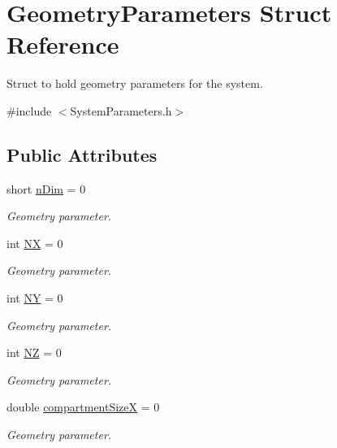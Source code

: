 \hypertarget{structGeometryParameters}{\section{Geometry\+Parameters Struct Reference}
\label{structGeometryParameters}
}


Struct to hold geometry parameters for the system.  




{\ttfamily \#include $<$System\+Parameters.\+h$>$}

\subsection*{Public Attributes}
{\bf }\par
\begin{DoxyCompactItemize}
\item 
short \hyperlink{structGeometryParameters_aa50b4a0940d8ca9da6f647a1c21d9522}{n\+Dim} = 0
\begin{DoxyCompactList}\small\item\em Geometry parameter. \end{DoxyCompactList}\item 
int \hyperlink{structGeometryParameters_a45f424cfb62b868a4becc8b0bd0d32bc}{N\+X} = 0
\begin{DoxyCompactList}\small\item\em Geometry parameter. \end{DoxyCompactList}\item 
int \hyperlink{structGeometryParameters_a5c7a33268cbfa1b236fa1bf0ef9bafc7}{N\+Y} = 0
\begin{DoxyCompactList}\small\item\em Geometry parameter. \end{DoxyCompactList}\item 
int \hyperlink{structGeometryParameters_a01890a89021cabfc92ee2b8e23faef60}{N\+Z} = 0
\begin{DoxyCompactList}\small\item\em Geometry parameter. \end{DoxyCompactList}\item 
double \hyperlink{structGeometryParameters_a74845fb942433ad543c1cb7ff437da2f}{compartment\+Size\+X} = 0
\begin{DoxyCompactList}\small\item\em Geometry parameter. \end{DoxyCompactList}\item 

\end{DoxyCompactItemize}
